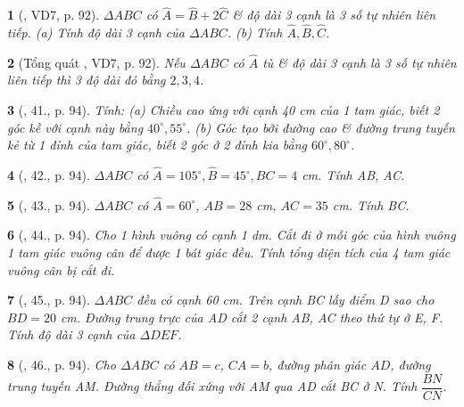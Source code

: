 \documentclass{article}
\newtheorem{baitoan}{}
\begin{document}
\begin{baitoan}[\cite{Binh_Toan_9_tap_1}, VD7, p. 92]
	$\Delta ABC$ có $\widehat{A} = \widehat{B} + 2\widehat{C}$ \& độ dài 3 cạnh là 3 số tự nhiên liên tiếp. (a) Tính độ dài 3 cạnh của $\Delta ABC$. (b) Tính $\widehat{A},\widehat{B},\widehat{C}$.
\end{baitoan}

\begin{baitoan}[Tổng quát \cite{Binh_Toan_9_tap_1}, VD7, p. 92]
	Nếu $\Delta ABC$ có $\widehat{A}$ tù \& độ dài 3 cạnh là 3 số tự nhiên liên tiếp thì 3 độ dài đó bằng $2,3,4$.
\end{baitoan}

\begin{baitoan}[\cite{Binh_Toan_9_tap_1}, 41., p. 94]
	Tính: (a) Chiều cao ứng với cạnh {\rm40 cm} của 1 tam giác, biết 2 góc kề với cạnh này bằng $40^\circ,55^\circ$. (b) Góc tạo bởi đường cao \& đường trung tuyến kẻ từ 1 đỉnh của tam giác, biết 2 góc ở 2 đỉnh kia bằng $60^\circ,80^\circ$.
\end{baitoan}

\begin{baitoan}[\cite{Binh_Toan_9_tap_1}, 42., p. 94]
	$\Delta ABC$ có $\widehat{A} = 105^\circ,\widehat{B} = 45^\circ, BC = 4$ {\rm cm}. Tính AB, AC.
\end{baitoan}

\begin{baitoan}[\cite{Binh_Toan_9_tap_1}, 43., p. 94]
	$\Delta ABC$ có $\widehat{A} = 60^\circ$, $AB = 28$ {\rm cm}, $AC = 35$ {\rm cm}. Tính BC.
\end{baitoan}

\begin{baitoan}[\cite{Binh_Toan_9_tap_1}, 44., p. 94]
	Cho 1 hình vuông có cạnh {\rm1 dm}. Cắt đi ở mỗi góc của hình vuông 1 tam giác vuông cân để được 1 bát giác đều. Tính tổng diện tích của 4 tam giác vuông cân bị cắt đi.
\end{baitoan}

\begin{baitoan}[\cite{Binh_Toan_9_tap_1}, 45., p. 94]
	$\Delta ABC$ đều có cạnh {\rm60 cm}. Trên cạnh BC lấy điểm D sao cho $BD = 20$ {\rm cm}. Đường trung trực của AD cắt 2 cạnh AB, AC theo thứ tự ở E, F. Tính độ dài 3 cạnh của $\Delta DEF$.
\end{baitoan}

\begin{baitoan}[\cite{Binh_Toan_9_tap_1}, 46., p. 94]
	Cho $\Delta ABC$ có $AB = c$, $CA = b$, đường phân giác $AD$, đường trung tuyến AM. Đường thẳng đối xứng với AM qua AD cắt BC ở N. Tính $\dfrac{BN}{CN}$.
\end{baitoan}
\end{document}
